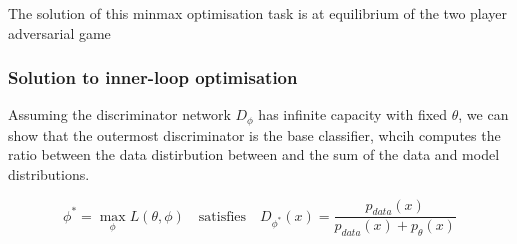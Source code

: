 \documentclass[11pt]{article}
\begin{document}
\begin{figure}[H]
    \centering
\end{figure}

The solution of this minmax optimisation task is at equilibrium of the two player adversarial game

\subsubsection{Solution to inner-loop optimisation}

Assuming the discriminator network $D_\phi$ has infinite capacity with fixed $\theta$, we can show that the outermost discriminator is the base classifier, whcih computes the ratio between the data distirbution between and the sum of the data and model distributions.

\begin{equation}
    \phi^* = \max_\phi L(\theta, \phi)\quad \text{satisfies} \quad D_{\phi^*}(x)=\frac{p_{data}(x)}{p_{data}(x)+p_\theta(x)}
\end{equation}
\end{document}
